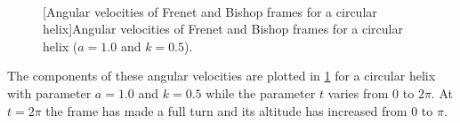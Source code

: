 \begin{figure}[p]
\centering
	\vspace{-0.5cm}
	\\
	[Angular velocities of Frenet and Bishop frames for a circular helix]{Angular velocities of Frenet and Bishop frames for a circular helix ($a=1.0$ and $k=0.5$).}
	\label{fig:frame_bench}
\end{figure}
The components of these angular velocities are plotted in \cref{fig:frame_bench} for a circular helix with parameter $a=1.0$ and $k=0.5$ while the parameter $t$ varies from $0$ to $2\pi$. At $t=2\pi$ the frame has made a full turn and its altitude has increased from $0$ to $\pi$. 

